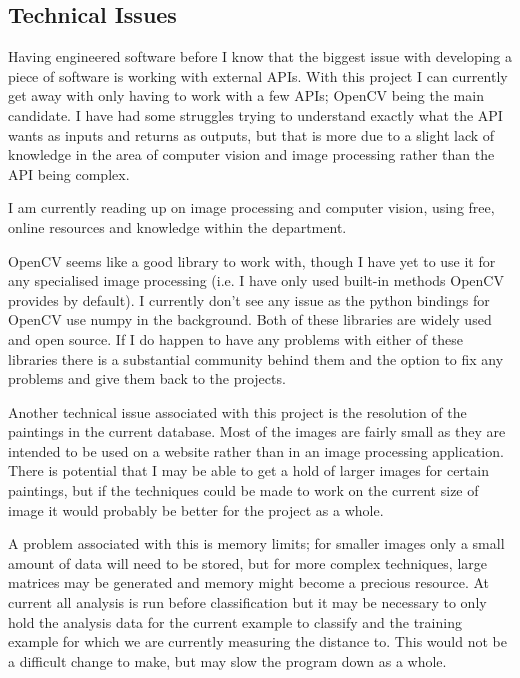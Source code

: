\documentclass[11pt,fleqn,twoside]{article}
\begin{document}
\subsection{Technical Issues}
Having engineered software before I know that the biggest issue with developing a piece of software
is working with external APIs. With this project I can currently get away with only having to work
with a few APIs; OpenCV being the main candidate. I have had some struggles trying to understand
exactly what the API wants as inputs and returns as outputs, but that is more due to a slight lack
of knowledge in the area of computer vision and image processing rather than the API being complex.

I am currently reading up on image processing and computer vision, using free,
online resources\cite{Prince2012Computer} and knowledge within the department.

OpenCV seems like a good library to work with, though I have yet to use it for any
specialised image processing (i.e. I have only used built-in methods OpenCV provides by default).
I currently don't see any issue as the python bindings for OpenCV use numpy in the background. Both
of these libraries are widely used and open source. If I do happen to have any problems with either
of these libraries there is a substantial community behind them and the option to fix any problems
and give them back to the projects.

Another technical issue associated with this project is the resolution of the paintings in the 
current database. Most of the images are fairly small as they are intended to be used on a website
rather than in an image processing application. There is potential that I may be able to get a hold
of larger images for certain paintings, but if the techniques could be made to work on the current
size of image it would probably be better for the project as a whole.

A problem associated with this is memory limits; for smaller images only a small amount of data
will need to be stored, but for more complex techniques, large matrices may be generated and memory
might become a precious resource. At current all analysis is run before classification but it may
be necessary to only hold the analysis data for the current example to classify and the training 
example for which we are currently measuring the distance to. This would not be a difficult change
to make, but may slow the program down as a whole.

\clearpage
\end{document}
